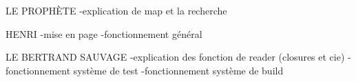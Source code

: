 
LE PROPHÈTE
-explication de map et la recherche


HENRI
-mise en page
-fonctionnement général

LE BERTRAND SAUVAGE
-explication des fonction de reader (closures et cie)
-fonctionnement système de test
-fonctionnement système de build